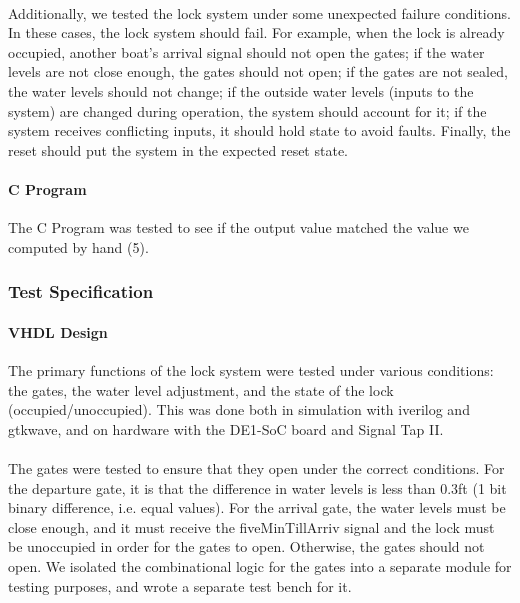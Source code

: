 \documentclass{article}
\begin{document}
      \paragraph{} Additionally, we tested the lock system under some unexpected failure conditions. In these cases, the lock system should fail. For example, when the lock is already occupied, another boat’s arrival signal should not open the gates; if the water levels are not close enough, the gates should not open; if the gates are not sealed, the water levels should not change; if the outside water levels (inputs to the system) are changed during operation, the system should account for it; if the system receives conflicting inputs, it should hold state to avoid faults. Finally, the reset should put the system in the expected reset state.

      \paragraph{C Program} The C Program was tested to see if the output value matched the value we computed by hand (5).

		\subsubsection{Test Specification}
      \paragraph{VHDL Design} The primary functions of the lock system were tested under various conditions: the gates, the water level adjustment, and the state of the lock (occupied/unoccupied). This was done both in simulation with iverilog and gtkwave, and on hardware with the DE1-SoC board and Signal Tap II.

      \paragraph{} The gates were tested to ensure that they open under the correct conditions. For the departure gate, it is that the difference in water levels is less than 0.3ft (1 bit binary difference, i.e. equal values). For the arrival gate, the water levels must be close enough, and it must receive the fiveMinTillArriv signal and the lock must be unoccupied in order for the gates to open. Otherwise, the gates should not open. We isolated the combinational logic for the gates into a separate module for testing purposes, and wrote a separate test bench for it.
\end{document}
